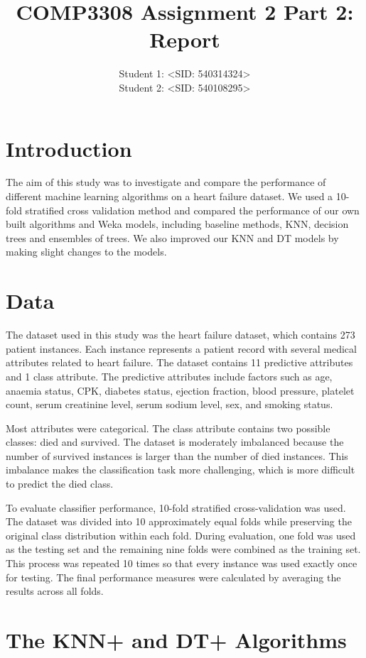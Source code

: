 \documentclass[12pt,a4paper]{article}
\title{COMP3308 Assignment 2 Part 2: Report}
\author{Student 1: \textless SID: 540314324\textgreater \\ Student 2: \textless SID: 540108295\textgreater}
\date{}
\begin{document}
\maketitle

\section{Introduction}

The aim of this study was to investigate and compare the performance of different machine learning algorithms on a heart failure dataset. We used a 10-fold stratified cross validation method and compared the performance of our own built algorithms and Weka models, including baseline methods, KNN, decision trees and ensembles of trees. We also improved our KNN and DT models by making slight changes to the models.

\section{Data}

The dataset used in this study was the heart failure dataset, which contains 273 patient instances. Each instance represents a patient record with several medical attributes related to heart failure. The dataset contains 11 predictive attributes and 1 class attribute. The predictive attributes include factors such as age, anaemia status, CPK, diabetes status, ejection fraction, blood pressure, platelet count, serum creatinine level, serum sodium level, sex, and smoking status.

Most attributes were categorical. The class attribute contains two possible classes: died and survived. The dataset is moderately imbalanced because the number of survived instances is larger than the number of died instances. This imbalance makes the classification task more challenging, which is more difficult to predict the died class.

To evaluate classifier performance, 10-fold stratified cross-validation was used. The dataset was divided into 10 approximately equal folds while preserving the original class distribution within each fold. During evaluation, one fold was used as the testing set and the remaining nine folds were combined as the training set. This process was repeated 10 times so that every instance was used exactly once for testing. The final performance measures were calculated by averaging the results across all folds.

\section{The KNN+ and DT+ Algorithms}
\end{document}

